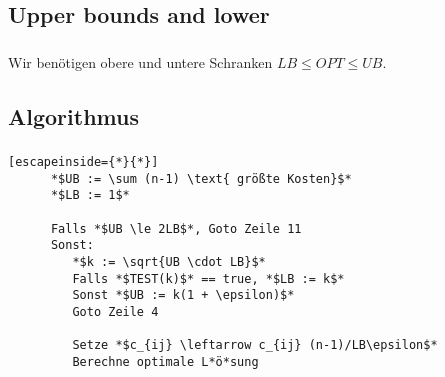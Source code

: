 \documentclass{beamer}
\begin{document}
\subsection{Upper bounds and lower}

\begin{frame}
   \frametitle{\insertsection}
   \framesubtitle{\insertsubsection}
   Wir benötigen obere und untere Schranken $LB \le OPT \le UB$.
  
\end{frame}

\subsection{Algorithmus}

\begin{frame}[fragile]
   \frametitle{\insertsection}
   \framesubtitle{\insertsubsection}
      \begin{lstlisting}[escapeinside={*}{*}]
      *$UB := \sum (n-1) \text{ größte Kosten}$*
      *$LB := 1$*

      Falls *$UB \le 2LB$*, Goto Zeile 11
      Sonst:
         *$k := \sqrt{UB \cdot LB}$*
         Falls *$TEST(k)$* == true, *$LB := k$*
         Sonst *$UB := k(1 + \epsilon)$*
         Goto Zeile 4

         Setze *$c_{ij} \leftarrow c_{ij} (n-1)/LB\epsilon$*
         Berechne optimale L*ö*sung
      \end{lstlisting}
\end{frame}
\end{document}
